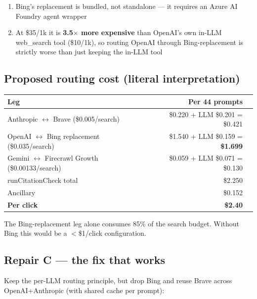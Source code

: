 \documentclass[11pt,letterpaper]{article}
\begin{document}
\begin{enumerate}[nosep]
  \item Bing's replacement is bundled, not standalone --- it requires an
    Azure AI Foundry agent wrapper
  \item At \$35/1k it is \textbf{3.5$\times$ more expensive} than OpenAI's
    own in-LLM web\_search tool (\$10/1k), so routing OpenAI through
    Bing-replacement is strictly worse than just keeping the in-LLM tool
\end{enumerate}

\subsection{Proposed routing cost (literal interpretation)}

\begin{center}
\begin{tabular}{@{}lrr@{}}
\toprule
\textbf{Leg} & \textbf{Per 44 prompts} \\
\midrule
Anthropic $\leftrightarrow$ Brave (\$0.005/search)             & \$0.220 + LLM \$0.201 = \$0.421 \\
OpenAI $\leftrightarrow$ Bing replacement (\$0.035/search)     & \$1.540 + LLM \$0.159 = \textbf{\$1.699} \\
Gemini $\leftrightarrow$ Firecrawl Growth (\$0.00133/search)   & \$0.059 + LLM \$0.071 = \$0.130 \\
\midrule
runCitationCheck total & \$2.250 \\
Ancillary              & \$0.152 \\
\textbf{Per click}     & \textbf{\$2.40} \\
\bottomrule
\end{tabular}
\end{center}

The Bing-replacement leg alone consumes 85\% of the search budget. Without
Bing this would be a $<$\$1/click configuration.

\subsection{Repair C --- the fix that works}

Keep the per-LLM routing principle, but drop Bing and reuse Brave across
OpenAI+Anthropic (with shared cache per prompt):
\end{document}

